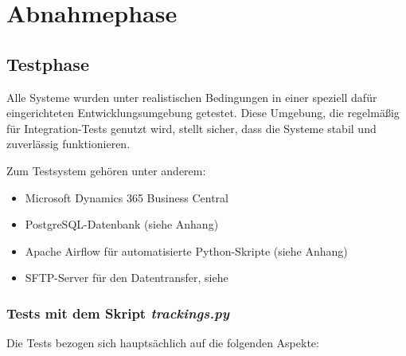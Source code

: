 \section{Abnahmephase}
\label{sec:Abnahmephase}

\subsection{Testphase}
\label{sec:Testphase}
Alle Systeme wurden unter realistischen Bedingungen in einer speziell dafür eingerichteten Entwicklungsumgebung getestet.
Diese Umgebung, die regelmäßig für Integration-Tests genutzt wird, stellt sicher, dass die Systeme stabil und
zuverlässig funktionieren.

Zum Testsystem gehören unter anderem:

\begin{itemize}
	\item Microsoft Dynamics 365 Business Central
	\item PostgreSQL-Datenbank (siehe Anhang)
	\item Apache Airflow für automatisierte Python-Skripte (siehe Anhang)
	\item SFTP-Server für den Datentransfer, siehe 
\end{itemize}

\subsubsection{Tests mit dem Skript \textit{trackings.py}}
\label{sec:Tests mit dem Skript trackings.py}

Die Tests bezogen sich hauptsächlich auf die folgenden Aspekte:

